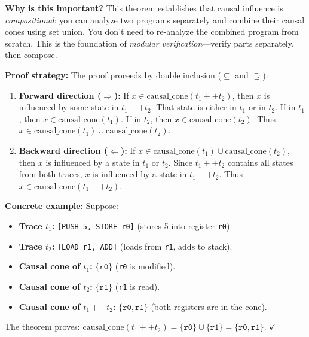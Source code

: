 \textbf{Why is this important?} This theorem establishes that causal influence is \textit{compositional}: you can analyze two programs separately and combine their causal cones using set union. You don't need to re-analyze the combined program from scratch. This is the foundation of \textit{modular verification}---verify parts separately, then compose.

\textbf{Proof strategy:} The proof proceeds by double inclusion ($\subseteq$ and $\supseteq$):
\begin{enumerate}
    \item \textbf{Forward direction ($\Rightarrow$):} If $x \in \text{causal\_cone}(t_1 ++ t_2)$, then $x$ is influenced by some state in $t_1 ++ t_2$. That state is either in $t_1$ or in $t_2$. If in $t_1$, then $x \in \text{causal\_cone}(t_1)$. If in $t_2$, then $x \in \text{causal\_cone}(t_2)$. Thus $x \in \text{causal\_cone}(t_1) \cup \text{causal\_cone}(t_2)$.
    
    \item \textbf{Backward direction ($\Leftarrow$):} If $x \in \text{causal\_cone}(t_1) \cup \text{causal\_cone}(t_2)$, then $x$ is influenced by a state in $t_1$ or $t_2$. Since $t_1 ++ t_2$ contains all states from both traces, $x$ is influenced by a state in $t_1 ++ t_2$. Thus $x \in \text{causal\_cone}(t_1 ++ t_2)$.
\end{enumerate}

\textbf{Concrete example:}
Suppose:
\begin{itemize}
    \item \textbf{Trace $t_1$:} \texttt{[PUSH 5, STORE r0]} (stores 5 into register \texttt{r0}).
    \item \textbf{Trace $t_2$:} \texttt{[LOAD r1, ADD]} (loads from \texttt{r1}, adds to stack).
    \item \textbf{Causal cone of $t_1$:} $\{\texttt{r0}\}$ (\texttt{r0} is modified).
    \item \textbf{Causal cone of $t_2$:} $\{\texttt{r1}\}$ (\texttt{r1} is read).
    \item \textbf{Causal cone of $t_1 ++ t_2$:} $\{\texttt{r0}, \texttt{r1}\}$ (both registers are in the cone).
\end{itemize}
The theorem proves: $\text{causal\_cone}(t_1 ++ t_2) = \{\texttt{r0}\} \cup \{\texttt{r1}\} = \{\texttt{r0}, \texttt{r1}\}$. $\checkmark$

